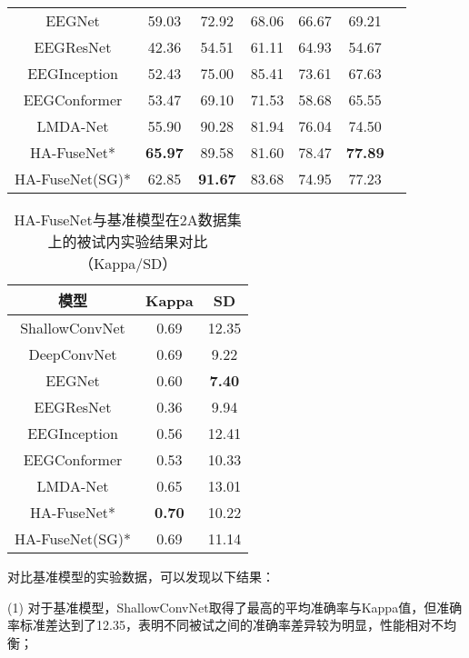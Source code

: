 \begin{table}[ht]
\begin{subtable}[ht]{\textwidth}
\begin{tabularx}{\textwidth}{cCCCCCC}
        EEGNet\cite{lawhern2018eegnet} & 59.03 & 72.92 & 68.06 & 66.67 & 69.21 \\
        EEGResNet\cite{HBM:HBM23730} & 42.36 & 54.51 & 61.11 & 64.93 & 54.67 \\
        EEGInception\cite{zhang2021eeg} & 52.43 & 75.00 & 85.41 & 73.61 & 67.63 \\
        EEGConformer\cite{song2022eeg} & 53.47 & 69.10 & 71.53 & 58.68 & 65.55 \\
        LMDA-Net\cite{miao2023lmda} & 55.90 & 90.28 & 81.94 & 76.04 & 74.50 \\
        HA-FuseNet*  & \textbf{65.97} & 89.58 & 81.60 & 78.47 & \textbf{77.89} \\
        HA-FuseNet(SG)*  & 62.85 & \textbf{91.67} & 83.68 & 74.95 & 77.23 \\
        \bottomrule
      \end{tabularx}
    \end{subtable}
\end{table}
\begin{table}[ht]
    \centering
    \caption{HA-FuseNet与基准模型在2A数据集上的被试内实验结果对比（Kappa/SD）}
    \label{tab:2acompareinsd}
    \begin{tabularx}{\textwidth}{CCC}
      \toprule
      模型 & Kappa & SD\\
      \midrule
      ShallowConvNet\cite{schirrmeister2017deep} & 0.69 & 12.35\\
      DeepConvNet\cite{schirrmeister2017deep} & 0.69 & 9.22 \\
      EEGNet\cite{lawhern2018eegnet} & 0.60 & \textbf{7.40} \\
      EEGResNet\cite{HBM:HBM23730} & 0.36 & 9.94 \\
      EEGInception\cite{zhang2021eeg} & 0.56 & 12.41 \\
      EEGConformer\cite{song2022eeg} & 0.53 & 10.33 \\
      LMDA-Net\cite{miao2023lmda} & 0.65 & 13.01 \\
      HA-FuseNet* &\textbf{0.70}&10.22\\
      HA-FuseNet(SG)* &0.69&11.14\\
      \bottomrule
    \end{tabularx}
\end{table}

对比基准模型的实验数据，可以发现以下结果：

(1) 对于基准模型，ShallowConvNet取得了最高的平均准确率与Kappa值，但准确率标准差达到了12.35，表明不同被试之间的准确率差异较为明显，性能相对不均衡；

